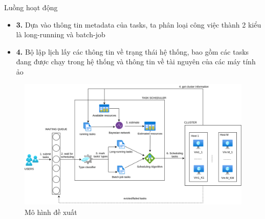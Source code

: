 \documentclass[11pt,xcolor={dvipsnames}, aspectratio=169]{beamer}
\begin{document}
\begin{frame}
	\begin{minipage}[t]{0.5\linewidth}
	\begin{block}{Luồng hoạt động}
		\begin{itemize}
			\item <1-> \textbf{3.} Dựa vào thông tin metadata của tasks, ta phân loại công việc thành 2 kiểu là long-running và batch-job
			\item <2-> \textbf{4.} Bộ lập lịch lấy các thông tin về trạng thái hệ thống, bao gồm các tasks đang được chạy trong hệ thống và thông tin về tài nguyên của các máy tính ảo  
		\end{itemize}
		\end{block}
	\end{minipage}
	\hfill
	\begin{minipage}[t]{0.49\linewidth}
		\begin{figure}
			\centering
			\includegraphics[scale=0.25]{images/system_flows.png}
			\caption{Mô hình đề xuất}			
		\end{figure}
	\end{minipage}
\end{frame}
\end{document}
